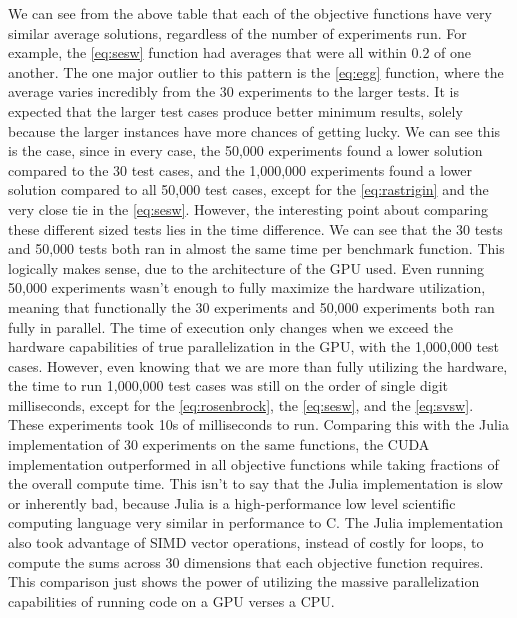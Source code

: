 \documentclass{article}
\begin{document}
$ $ \\ $ $ \\ 
We can see from the above table that each of the objective functions have very similar average solutions, regardless of the number of experiments run. For example, the \ref{eq:sesw} function had averages that were all within 0.2 of one another. The one major outlier to this pattern is the \ref{eq:egg} function, where the average varies incredibly from the 30 experiments to the larger tests. It is expected that the larger test cases produce better minimum results, solely because the larger instances have more chances of getting lucky. We can see this is the case, since in every case, the 50,000 experiments found a lower solution compared to the 30 test cases, and the 1,000,000 experiments found a lower solution compared to all 50,000 test cases, except for the \ref{eq:rastrigin} and the very close tie in the \ref{eq:sesw}. However, the interesting point about comparing these different sized tests lies in the time difference. We can see that the 30 tests and 50,000 tests both ran in almost the same time per benchmark function. This logically makes sense, due to the architecture of the GPU used. Even running 50,000 experiments wasn't enough to fully maximize the hardware utilization, meaning that functionally the 30 experiments and 50,000 experiments both ran fully in parallel. The time of execution only changes when we exceed the hardware capabilities of true parallelization in the GPU, with the 1,000,000 test cases. However, even knowing that we are more than fully utilizing the hardware, the time to run 1,000,000 test cases was still on the order of single digit milliseconds, except for the \ref{eq:rosenbrock}, the \ref{eq:sesw}, and the \ref{eq:svsw}. These experiments took 10s of milliseconds to run. Comparing this with the Julia implementation of 30 experiments on the same functions, the CUDA implementation outperformed in all objective functions while taking fractions of the overall compute time. This isn't to say that the Julia implementation is slow or inherently bad, because Julia is a high-performance low level scientific computing language very similar in performance to C. The Julia implementation also took advantage of SIMD vector operations, instead of costly for loops, to compute the sums across 30 dimensions that each objective function requires. This comparison just shows the power of utilizing the massive parallelization capabilities of running code on a GPU verses a CPU. 
\end{document}
